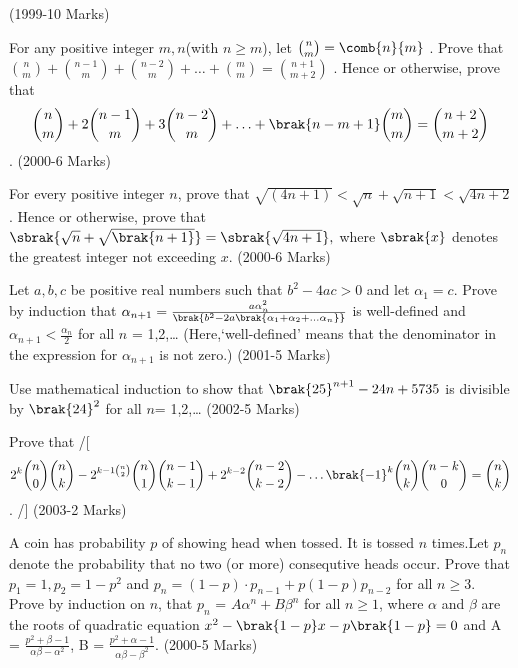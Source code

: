 \hfill(1999-10 Marks)
\item
For any positive integer $m,n$(with $n \geq m$), let $\binom{n}{m} =\comb{n}{m}$ . Prove that $\binom{n}{m} + \binom{n-1}{m} + \binom{n-2}{m} + \ldots + \binom{m}{m} = \binom{n+1}{m+2}$ . Hence or otherwise, prove that 
\begin{align}
\binom{n}{m} +2\binom{n-1}{m} +3\binom{n-2}{m}+\ldots+ \brak{n-m+1} \binom{m}{m} = \binom{n+2}{m+2}
\end{align}.
\hfill(2000-6 Marks)
\item
For every positive integer $n$, prove that $\sqrt{(4n+1)} < \sqrt{n} +\sqrt{n+1} < \sqrt{4n+2}$. Hence or otherwise, prove that $\sbrak{\sqrt{n} + \sqrt{\brak{n+1}}}= \sbrak{\sqrt{4n+1}},$ where $\sbrak{x}$ denotes the greatest integer not exceeding $x$.
\hfill(2000-6 Marks)
\item
Let $a,b,c$ be positive real numbers such that $b^2 - 4ac > 0$ and let $\alpha_1 = c$. Prove by induction that $\alpha_{n+1} = \frac{a\alpha_{n}^2}{\brak{b^2 - 2a \brak{\alpha_1 + \alpha_2 + \ldots \alpha_n}}}$ is well-defined and $\alpha_{n+1} < \frac{\alpha_n}{2}$ for all $n$ = 1,2,\ldots
(Here,`well-defined' means that the denominator in the expression for $\alpha_{n+1}$ is not zero.)
\hfill(2001-5 Marks)
\item
Use mathematical induction to show that $\brak{25}^{n+1} - 24 n + 5735$ is divisible by $\brak{24}^2$ for all $n$= 1,2,\ldots
\hfill(2002-5 Marks)
\item 
Prove that
		/[
\begin{align}
	{2}^{k} \binom{n}{0}\binom{n}{k} - 2^{k-1\binom{n}{2}} \binom{n}{1} \binom{n-1}{k-1} + 2^{k-2}\binom{n-2}{k-2} - \ldots \brak{-1}^k \binom{n}{k}\binom{n-k}{0} = \binom{n}{k}
\end{align}.
		/]
\hfill(2003-2 Marks)
\item
A coin has probability $p$ of showing head when tossed. It is tossed $n$ times.Let $p_n$ denote the probability that no two (or more) consequtive heads occur. Prove that $p_1=1 , p_2=1-p^2$ and $p_n = (1-p)\cdot p_{n-1} + p(1-p)p_{n-2}$ for all $ n \geq 3 $. Prove by induction on $n$, that $p_n$ = $A\alpha^n + B\beta^n$ for all $n \geq 1$, where $\alpha$ and $\beta$ are the roots of quadratic equation $x^2 - \brak{1-p}x - p\brak{1-p} = 0$ and A = $\frac{p^2 + \beta -1}{\alpha\beta-\alpha^2}$, B = $\frac{p^2 + \alpha -1}{\alpha\beta - \beta^2}$.
\hfill(2000-5 Marks)






